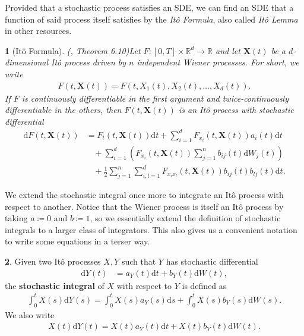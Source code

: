 \documentclass[english]{article}
\numberwithin{equation}{section}
\numberwithin{figure}{section}
\theoremstyle{bolddescit}
\newtheorem{theorem}{\protect\theoremname}[section]
\theoremstyle{definition}
\newtheorem{definition}[theorem]{\protect\definitionname}
\theoremstyle{definition}
\theoremstyle{plain}
\theoremstyle{plain}
\theoremstyle{bolddesc}
\theoremstyle{plain}
\theoremstyle{remark}
\providecommand{\definitionname}{Definition}
\providecommand{\theoremname}{Theorem}
\begin{document}
Provided that a stochastic process satisfies an SDE, we can find an SDE that a function of said process itself satisfies by the \textit{It\^o Formula}, also called \textit{It\^o Lemma} in other resources.

\begin{theorem}[It\^o Formula]
  (\cite{capinski_blackscholes_2012}, Theorem 6.10)\label{thm:ito-formula}
  Let $F : [0,T] \times \mathbb{R}^d \to \mathbb{R}$ and let $\mathbf{X}(t)$ be a $d$-dimensional It\^o process driven by $n$ independent Wiener processes. For short, we write
  \begin{align*}
    F(t,\mathbf{X}(t)) = F(t,X_1(t),X_2(t),\ldots,X_d(t)).
  \end{align*}
  If $F$ is continuously differentiable in the first argument and twice-continuously differentiable in the others, then $F(t,\mathbf{X}(t))$ is an It\^o process with stochastic differential
  \begin{align*}
    \mathrm{d}F(t,\mathbf{X}(t))
    &= F_t(t,\mathbf{X}(t)) \mathrm{d}t + \sum_{i=1}^d F_{x_i}(t,\mathbf{X}(t)) a_i(t) \mathrm{d}t\\
    &\ \ \ \ + \sum_{i=1}^d \left(F_{x_i}(t,\mathbf{X}(t)) \sum_{j=1}^n b_{ij}(t) \mathrm{d}W_j(t) \right)\\
    &\ \ \ \ + \frac{1}{2} \sum_{j=1}^n \sum_{i,l=1}^d F_{x_i x_l}(t,\mathbf{X}(t)) b_{ij}(t)b_{lj}(t) \mathrm{d}t.
  \end{align*}
\end{theorem}

We extend the stochastic integral once more to integrate an It\^o process with respect to another. Notice that the Wiener process is itself an It\^o process by taking $a \coloneqq 0$ and $b \coloneqq 1$, so we essentially extend the definition of stochastic integrals to a larger class of integrators. This also gives us a convenient notation to write some equations in a terser way.

\begin{definition}
  Given two It\^o processes $X, Y$ such that $Y$ has stochastic differential
  \begin{align*}
    \mathrm{d}Y(t) &= a_Y(t) \mathrm{d}t + b_Y(t) \mathrm{d}W(t),
  \end{align*}
  the \textbf{stochastic integral} of $X$ with respect to $Y$ is defined as
  \begin{align*}
    \int_0^t X(s) \mathrm{d}Y(s) = \int_0^t X(s) a_Y(s) \mathrm{d}s + \int_0^t X(s) b_Y(s) \mathrm{d}W(s).
  \end{align*}
  We also write
  \begin{align*}
    X(t) \mathrm{d}Y(t) = X(t) a_Y(t) \mathrm{d}t + X(t) b_Y(t) \mathrm{d}W(t).
  \end{align*}
\end{definition}
\end{document}
